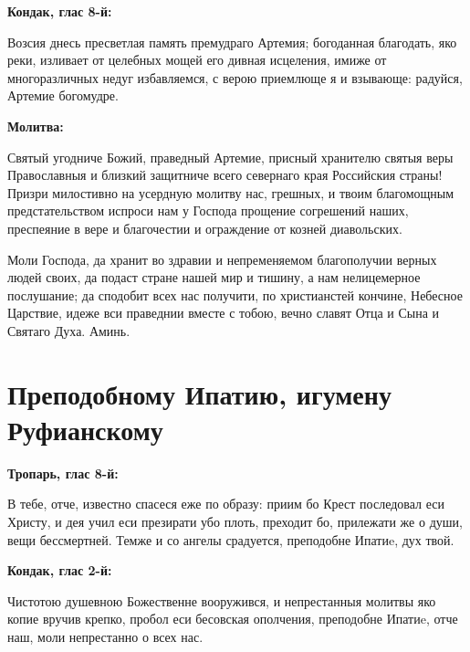 \medskip


\bfseries Кондак, глас 8-й:\normalfont{}\nopagebreak


Возсия днесь пресветлая память премудраго Артемия; богоданная благодать, яко реки, изливает от целебных мощей его дивная исцеления, имиже от многоразличных недуг избавляемся, с верою приемлюще я и взывающе: радуйся, Артемие богомудре.


\medskip


\bfseries Молитва:\normalfont{}\nopagebreak


Святый угодниче Божий, праведный Артемие, присный хранителю святыя веры Православныя и близкий защитниче всего севернаго края Российския страны! Призри милостивно на усердную молитву нас, грешных, и твоим благомощным предстательством испроси нам у Господа прощение согрешений наших, преспеяние в вере и благочестии и ограждение от козней диавольских. 

Моли Господа, да хранит во здравии и непременяемом благополучии верных людей своих, да подаст стране нашей мир и тишину, а нам нелицемерное послушание; да сподобит всех нас получити, по христианстей кончине, Небесное Царствие, идеже вси праведнии вместе с тобою, вечно славят Отца и Сына и Святаго Духа. Аминь.
\nopagebreak\bigskip\bigskip\mychapterending


 

\section{Преподобному Ипатию, игумену Руфианскому}
 


\bfseries Тропарь, глас 8-й:\normalfont{}\nopagebreak


В тебе, отче, известно спасеся еже по образу: приим бо Крест последовал еси Христу, и дея учил еси презирати убо плоть, преходит бо, прилежати же о души, вещи бессмертней.  Темже и со ангелы срадуется, преподобне Ипатиe, дух твой.


\medskip


\bfseries Кондак, глас 2-й:\normalfont{}\nopagebreak


Чистотою душевною Божественне вооружився, и непрестанныя молитвы яко копие вручив крепко, пробол еси бесовская ополчения, преподобне Ипатиe, отче наш, моли непрестанно о всех нас.


\medskip


